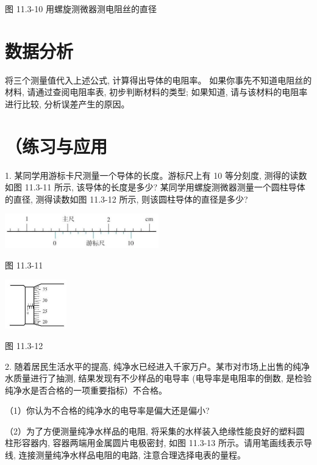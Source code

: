 \documentclass[10pt]{article}
\begin{document}
图 11.3-10 用螺旋测微器测电阻丝的直径

\section*{数据分析}

将三个测量值代入上述公式, 计算得出导体的电阻率。 如果你事先不知道电阻丝的材料, 请通过查阅电阻率表, 初步判断材料的类型; 如果知道, 请与该材料的电阻率进行比较, 分析误差产生的原因。

\section*{（练习与应用}

1. 某同学用游标卡尺测量一个导体的长度。游标尺上有 10 等分刻度, 测得的读数如图 11.3-11 所示, 该导体的长度是多少? 某同学用螺旋测微器测量一个圆柱导体的直径, 测得读数如图 11.3-12 所示, 则该圆柱导体的直径是多少?

\begin{center}
\includegraphics[max width=0.5\textwidth]{images/01911d5f-8e38-70c0-b5b8-2b399bd115b6_72_437529.jpg}
\end{center}

图 11.3-11

\begin{center}
\includegraphics[max width=0.2\textwidth]{images/01911d5f-8e38-70c0-b5b8-2b399bd115b6_72_660723.jpg}
\end{center}

图 11.3-12

2. 随着居民生活水平的提高, 纯净水已经进入千家万户。某市对市场上出售的纯净水质量进行了抽测, 结果发现有不少样品的电导率 (电导率是电阻率的倒数, 是检验纯净水是否合格的一项重要指标）不合格。

（1）你认为不合格的纯净水的电导率是偏大还是偏小?

（2）为了方便测量纯净水样品的电阻, 将采集的水样装入绝缘性能良好的塑料圆柱形容器内, 容器两端用金属圆片电极密封, 如图 11.3-13 所示。请用笔画线表示导线, 连接测量纯净水样品电阻的电路, 注意合理选择电表的量程。
\end{document}
